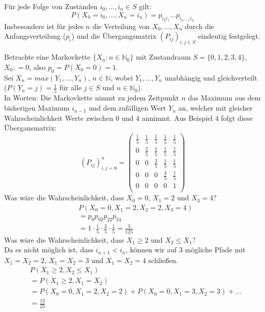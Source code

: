 \documentclass[a4paper,12pt]{article}
\begin{document}
\begin{tcolorbox}[breakable, colframe=green, colback=white, title=Satz 6]
	Für jede Folge von Zuständen $i_0, ..., i_n \in S$ gilt:
	$$
		P(X_0 = i_0, ..., X_n = i_n) = p_{i_0i_1}...p_{i_{n-1}i_n}
	$$
	Insbesondere ist für jedes $n$ die Verteilung von $X_0, ...,X_n$ durch die Anfangsverteilung ($p_i$) und die
	Übergangsmatrix $(P_{ij})_{i,j \in S}$ eindeutig festgelegt.
\end{tcolorbox}

\begin{tcolorbox}[breakable, colframe=blue, colback=white, title=Beispiel 7]
	Betrachte eine Markovkette $\{ X_n: n \in \mathbb{N}_0\}$ mit Zustandraum $S = \{0,1,2,3,4\}$, $X_0: = 0$, also $p_0 = P(X_0 = 0)=1$.\\
	Sei $X_n = max(Y_1, ..., Y_n)$, $n \in \mathbb{N}$, wobei $Y_1, ..., Y_n$ unabhängig und gleichverteilt ($P(Y_n = j) = \frac{1}{5}$ für alle $j \in S$ und $n \in \mathbb{N}_0$).\\
	In Worten: Die Markovkette nimmt zu jedem Zeitpunkt $n$ das Maximum aus dem bisherigen Maximum $i_{n-1}$ und dem zufälligen Wert $Y_n$ an,
	welcher mit gleicher Wahrscheinlichkeit Werte zwischen 0 und 4 annimmt. Aus Beispiel 4 folgt diese Übergansmatrix:
	$$
		(P_{ij})_{i,j = 0}^n =
		\begin{pmatrix}
			\frac{1}{5} & \frac{1}{5} & \frac{1}{5} & \frac{1}{5} & \frac{1}{5} \\
			0           & \frac{2}{5} & \frac{1}{5} & \frac{1}{5} & \frac{1}{5} \\
			0           & 0           & \frac{3}{5} & \frac{1}{5} & \frac{1}{5} \\
			0           & 0           & 0           & \frac{4}{5} & \frac{1}{5} \\
			0           & 0           & 0           & 0           & 1           \\
		\end{pmatrix}
	$$
	Was wäre die Wahrscheinlichkeit, dass $X_0 = 0$, $X_1 = 2$ und $X_3 = 4$?
	\begin{align*}
		 & P(X_0 = 0, X_1 = 2, X_2 = 2, X_3 = 4)                                      \\
		 & =  p_0p_{02}p_{22}p_{24}                                                   \\
		 & =  1 \cdot \frac{1}{5} \cdot \frac{3}{5} \cdot \frac{1}{5} = \frac{3}{125}
	\end{align*}
	Was wäre die Wahrscheinlichkeit, dass $X_1 \geq 2$ und $X_2 \leq X_1$?\\
	Da es nicht möglich ist, dass $i_{n+1} < i_n$, können wir auf 3 mögliche Pfade mit $X_1 = X_2 = 2$, $X_1 = X_2 = 3$ und $X_1 = X_2 = 4$ schließen.
	\begin{align*}
		 & P(X_1 \geq 2, X_2 \leq X_1)                                            \\
		 & =  P(X_1 \geq 2, X_1 = X_2)                                            \\
		 & =  P(X_0 = 0, X_1 = 2, X_2 = 2) + P(X_0 = 0, X_1 = 3, X_2 = 3) + \dots \\
		 & = \frac{12}{25}
	\end{align*}
\end{tcolorbox}
\end{document}
